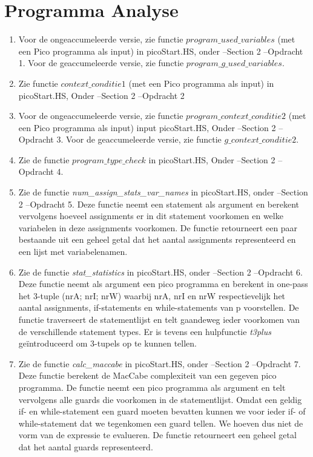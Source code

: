 \documentclass[12pt]{article}
\begin{document}
    \section{Programma Analyse}
    \begin{enumerate}
        \item Voor de ongeaccumeleerde versie, zie functie $program\_used\_variables$ (met een Pico programma als input) in picoStart.HS, onder --Section 2 --Opdracht 1. Voor de geaccumeleerde versie, zie functie $program\_g\_used\_variables$.
        \item Zie functie $context\_conditie1$ (met een Pico programma als input) in picoStart.HS, Onder --Section 2 --Opdracht 2
        \item Voor de ongeaccumeleerde versie, zie functie $program\_context\_conditie2$ (met een Pico programma als input) input picoStart.HS, Onder --Section 2 --Opdracht 3. Voor de geaccumeleerde versie, zie functie $g\_context\_conditie2$.

        \item Zie de functie $program\_type\_check$ in picoStart.HS, Onder --Section 2 --Opdracht 4.\\
        
        
        \item Zie de functie \textit{num\_assign\_stats\_var\_names} in picoStart.HS, onder --Section 2 --Opdracht 5. Deze functie neemt een statement als argument en berekent vervolgens hoeveel assignments er in dit statement voorkomen en welke variabelen in deze assignments voorkomen. De functie retourneert een paar bestaande uit een geheel getal dat het aantal assignments representeerd en een lijst met variabelenamen.
        \item Zie de functie \textit{stat\_statistics} in picoStart.HS, onder --Section 2 --Opdracht 6. Deze functie neemt als argument een pico programma en berekent in one-pass het 3-tuple (nrA; nrI; nrW) waarbij nrA, nrI en nrW respectievelijk het aantal assignments, if-statements en while-statements van p voorstellen. De functie traverseert de statementlijst en telt gaandeweg ieder voorkomen van de verschillende statement types. Er is tevens een hulpfunctie \textit{t3plus} ge\"{i}ntroduceerd om 3-tupels op te kunnen tellen.
        \item Zie de functie \textit{calc\_maccabe} in picoStart.HS, onder --Section 2 --Opdracht 7. Deze functie berekent de MacCabe complexiteit van een gegeven pico programma. De functie neemt een pico programma als argument en telt vervolgens alle guards die voorkomen in de statementlijst. Omdat een geldig if- en while-statement een guard moeten bevatten kunnen we voor ieder if- of while-statement dat we tegenkomen een guard tellen. We hoeven dus niet de vorm van de expressie te evalueren. De functie retourneert een geheel getal dat het aantal guards representeerd.
    \end{enumerate}
    
\end{document}
